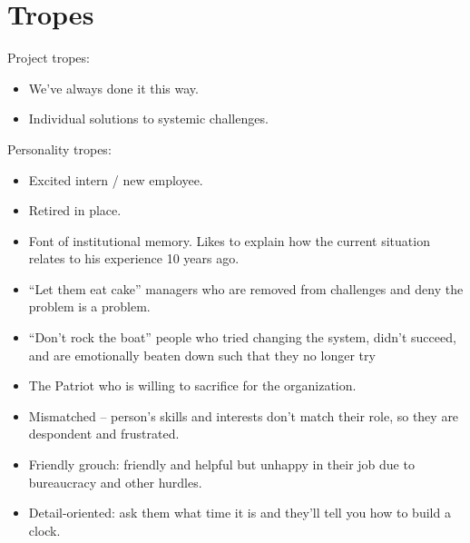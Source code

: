 \section{Tropes\label{sec:tropes}}

Project tropes:
\begin{itemize}
    \item We've always done it this way.
    \item Individual solutions to systemic challenges.
\end{itemize}


Personality tropes:
\begin{itemize}
    \item Excited intern / new employee.
    \item Retired in place.
    \item Font of institutional memory. Likes to explain how the current situation relates to his experience 10 years ago. 
    \item ``Let them eat cake'' managers who are removed from challenges and deny the problem is a problem. 
    \item ``Don't rock the boat'' people who tried changing the system, didn't succeed, and are emotionally beaten down such that they no longer try
    \item The Patriot who is willing to sacrifice for the organization.
    \item Mismatched -- person's skills and interests don't match their role, so they are despondent and frustrated. 
    \item Friendly grouch: friendly and helpful but unhappy in their job due to bureaucracy and other hurdles.
    \item Detail-oriented: ask them what time it is and they'll tell you how to build a clock.
\end{itemize}



